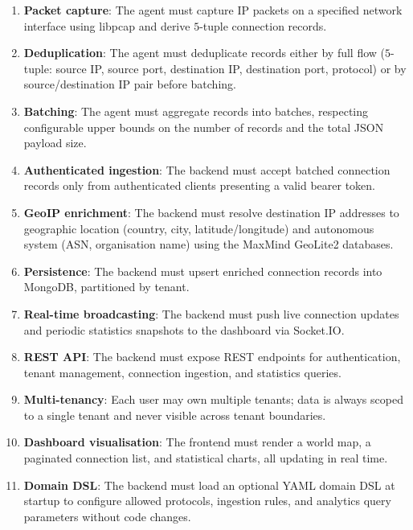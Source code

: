 \documentclass[12pt]{report}
\begin{document}
\begin{enumerate}
    \item \textbf{Packet capture}: The agent must capture IP packets on a specified network
          interface using libpcap and derive $5$-tuple connection records.
    \item \textbf{Deduplication}: The agent must deduplicate records either by full flow
          ($5$-tuple: source IP, source port, destination IP, destination port, protocol) or by
          source/destination IP pair before batching.
    \item \textbf{Batching}: The agent must aggregate records into batches, respecting
          configurable upper bounds on the number of records and the total JSON payload size.
    \item \textbf{Authenticated ingestion}: The backend must accept batched connection records
          only from authenticated clients presenting a valid bearer token.
    \item \textbf{GeoIP enrichment}: The backend must resolve destination IP addresses to
          geographic location (country, city, latitude/longitude) and autonomous system (ASN,
          organisation name) using the MaxMind GeoLite2 databases.
    \item \textbf{Persistence}: The backend must upsert enriched connection records into
          MongoDB, partitioned by tenant.
    \item \textbf{Real-time broadcasting}: The backend must push live connection updates and
          periodic statistics snapshots to the dashboard via Socket.IO.
    \item \textbf{REST API}: The backend must expose REST endpoints for authentication, tenant
          management, connection ingestion, and statistics queries.
    \item \textbf{Multi-tenancy}: Each user may own multiple tenants; data is always scoped to
          a single tenant and never visible across tenant boundaries.
    \item \textbf{Dashboard visualisation}: The frontend must render a world map, a paginated
          connection list, and statistical charts, all updating in real time.
    \item \textbf{Domain DSL}: The backend must load an optional YAML domain DSL at startup to
          configure allowed protocols, ingestion rules, and analytics query parameters without
          code changes.
\end{enumerate}
\end{document}
